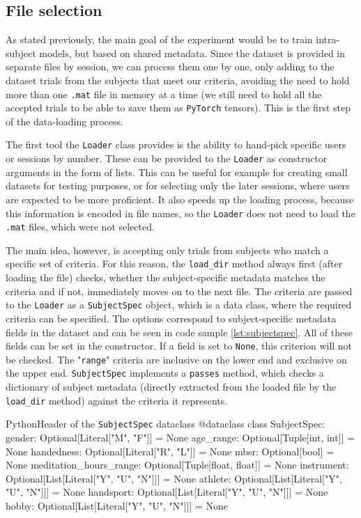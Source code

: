 \documentclass[english, he, bc, kiv, iso690alph, viewonly]{fasthesis}
\begin{document}
\subsection{File selection}

As stated previously, the main goal of the experiment would be to train intra-subject models, but based on shared metadata. Since the dataset is provided in separate files by session, we can process them one by one, only adding to the dataset trials from the subjects that meet our criteria, avoiding the need to hold more than one \texttt{.mat} file in memory at a time (we still need to hold all the accepted trials to be able to save them as \texttt{PyTorch} tensors). This is the first step of the data-loading process.

The first tool the \texttt{Loader} class provides is the ability to hand-pick specific users or sessions by number. These can be provided to the \texttt{Loader} as constructor arguments in the form of lists. This can be useful for example for creating small datasets for testing purposes, or for selecting only the later sessions, where users are expected to be more proficient. It also speeds up the loading process, because this information is encoded in file names, so the \texttt{Loader} does not need to load the \texttt{.mat} files, which were not selected.

The main idea, however, is accepting only trials from subjects who match a specific set of criteria. For this reason, the \texttt{load\_dir} method always first (after loading the file) checks, whether the subject-specific metadata matches the criteria and if not, immediately moves on to the next file. The criteria are passed to the \texttt{Loader} as a \texttt{SubjectSpec} object, which is a data class, where the required criteria can be specified. The options correspond to subject-specific metadata fields in the dataset and can be seen in code sample \ref{lst:subjectspec}. All of these fields can be set in the constructor. If a field is set to \texttt{None}, this criterion will not be checked. The "\texttt{range}" criteria are inclusive on the lower end and exclusive on the upper end. \texttt{SubjectSpec} implements a \texttt{passes} method, which checks a dictionary of subject metadata (directly extracted from the loaded file by the \texttt{load\_dir} method) against the criteria it represents.

\begin{code}{Python}{Header of the \texttt{SubjectSpec} dataclass\label{lst:subjectspec}}
	@dataclass
	class SubjectSpec:
	gender: Optional[Literal["M", "F"]] = None
	age_range: Optional[Tuple[int, int]] = None
	handedness: Optional[Literal["R", "L"]] = None
	mbsr: Optional[bool] = None
	meditation_hours_range: Optional[Tuple[float, float]] = None
	instrument: Optional[List[Literal["Y", "U", "N"]]] = None
	athlete: Optional[List[Literal["Y", "U", "N"]]] = None
	handsport: Optional[List[Literal["Y", "U", "N"]]] = None
	hobby: Optional[List[Literal["Y", "U", "N"]]] = None
\end{code}
\end{document}
